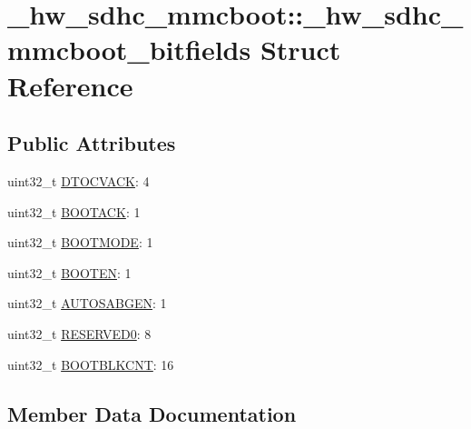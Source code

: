 \hypertarget{struct__hw__sdhc__mmcboot_1_1__hw__sdhc__mmcboot__bitfields}{}\section{\+\_\+hw\+\_\+sdhc\+\_\+mmcboot\+:\+:\+\_\+hw\+\_\+sdhc\+\_\+mmcboot\+\_\+bitfields Struct Reference}
\label{struct__hw__sdhc__mmcboot_1_1__hw__sdhc__mmcboot__bitfields}
\subsection*{Public Attributes}
\begin{DoxyCompactItemize}
\item 
uint32\+\_\+t \hyperlink{struct__hw__sdhc__mmcboot_1_1__hw__sdhc__mmcboot__bitfields_aae3375e451332169c286a0382e9de3a1}{D\+T\+O\+C\+V\+A\+CK}\+: 4
\item 
uint32\+\_\+t \hyperlink{struct__hw__sdhc__mmcboot_1_1__hw__sdhc__mmcboot__bitfields_ab7c71a27c199602c10515ded7f5ac932}{B\+O\+O\+T\+A\+CK}\+: 1
\item 
uint32\+\_\+t \hyperlink{struct__hw__sdhc__mmcboot_1_1__hw__sdhc__mmcboot__bitfields_ae4a0d3d9a09c571907b7529685705c5d}{B\+O\+O\+T\+M\+O\+DE}\+: 1
\item 
uint32\+\_\+t \hyperlink{struct__hw__sdhc__mmcboot_1_1__hw__sdhc__mmcboot__bitfields_aa1520d9ef5ba9f2135f707886a3a80a5}{B\+O\+O\+T\+EN}\+: 1
\item 
uint32\+\_\+t \hyperlink{struct__hw__sdhc__mmcboot_1_1__hw__sdhc__mmcboot__bitfields_a880a301a305f83602a38b898e491d567}{A\+U\+T\+O\+S\+A\+B\+G\+EN}\+: 1
\item 
uint32\+\_\+t \hyperlink{struct__hw__sdhc__mmcboot_1_1__hw__sdhc__mmcboot__bitfields_af99ff04a15950a16d26608975c4d9dbe}{R\+E\+S\+E\+R\+V\+E\+D0}\+: 8
\item 
uint32\+\_\+t \hyperlink{struct__hw__sdhc__mmcboot_1_1__hw__sdhc__mmcboot__bitfields_ae633c9b5eff8926f0b9b818d5247db6d}{B\+O\+O\+T\+B\+L\+K\+C\+NT}\+: 16
\end{DoxyCompactItemize}


\subsection{Member Data Documentation}
